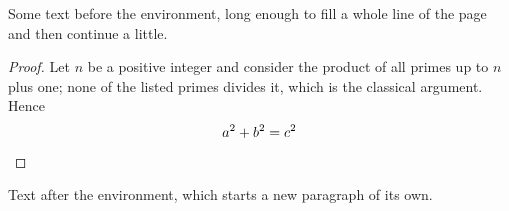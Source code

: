 \documentclass[11pt]{article}
\begin{document}
Some text before the environment, long enough to fill a whole line of the page and then continue a little.
\begin{proof}
Let $n$ be a positive integer and consider the product of all primes up to $n$ plus one; none of the listed primes divides it, which is the classical argument. Hence
\begin{equation*}
  a^2 + b^2 = c^2 \qedhere
\end{equation*}
\end{proof}
Text after the environment, which starts a new paragraph of its own.
\end{document}
